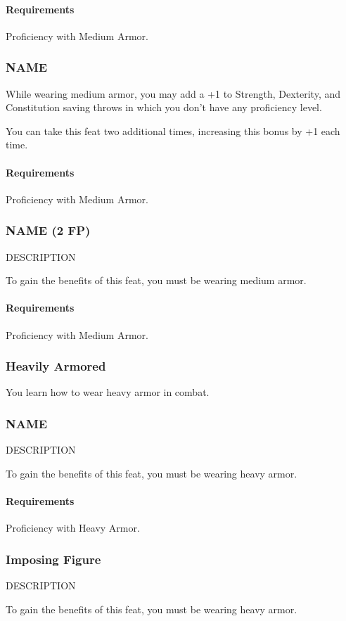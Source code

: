     \paragraph{Requirements} Proficiency with Medium Armor.
\subsubsection{NAME} \label{feat::name}
    While wearing medium armor, you may add a +1 to Strength, Dexterity, and Constitution saving throws in which you don't have any proficiency level.

    You can take this feat two additional times, increasing this bonus by +1 each time.
    \paragraph{Requirements} Proficiency with Medium Armor.
\subsubsection{NAME (2 FP)} \label{feat::name}
    DESCRIPTION

    To gain the benefits of this feat, you must be wearing medium armor.
    \paragraph{Requirements} Proficiency with Medium Armor.
\subsubsection{Heavily Armored} \label{feat::heavilyarmored}
    You learn how to wear heavy armor in combat.
\subsubsection{NAME} \label{feat::name}
    DESCRIPTION

    To gain the benefits of this feat, you must be wearing heavy armor.
    \paragraph{Requirements} Proficiency with Heavy Armor.
\subsubsection{Imposing Figure} \label{feat::imposingfigure}
    DESCRIPTION

    To gain the benefits of this feat, you must be wearing heavy armor.
